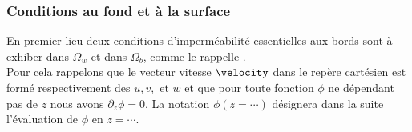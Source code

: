 
\subsubsection{Conditions au fond et à la surface}

\noindent En premier lieu deux conditions d'imperméabilité essentielles aux bords sont à exhiber dans $\Omega_w$ et dans $\Omega_b$, comme le rappelle \citet{Pons2018}.\\
Pour cela rappelons que le vecteur vitesse $\velocity$ dans le repère cartésien est formé respectivement des $u, v,$ et $w$ et que pour toute fonction $\phi$ ne dépendant pas de $z$ nous avons $\partial_z \phi = 0$. La notation $\phi (z = \cdots)$ désignera dans la suite l'évaluation de $\phi$ en $z=\cdots$.
